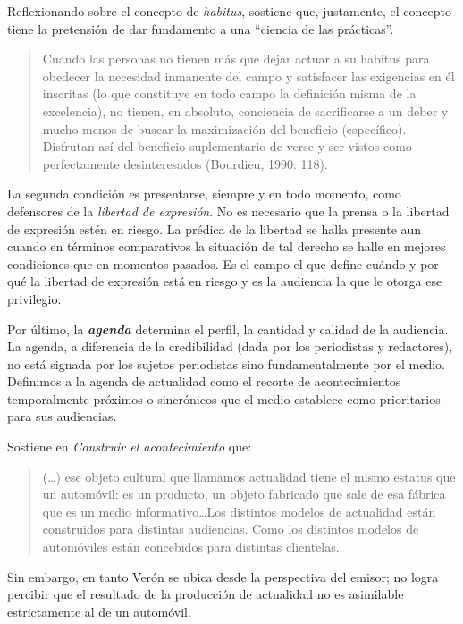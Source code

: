 Reflexionando sobre el concepto de \emph{habitus}, sostiene que, justamente, el concepto tiene la pretensión de dar fundamento a una \enquote{ciencia de las prácticas}.

\begin{quote}
	Cuando las personas no tienen más que dejar actuar a su habitus para obedecer la necesidad inmanente del campo y satisfacer las exigencias en él inscritas (lo que constituye en todo campo la definición misma de la excelencia), no tienen, en absoluto, conciencia de sacrificarse a un deber y mucho menos de buscar la maximización del beneficio (específico). Disfrutan así del beneficio suplementario de verse y ser vistos como perfectamente desinteresados (Bourdieu, 1990: 118).
\end{quote}

La segunda condición es presentarse, siempre y en todo momento, como defensores de la \emph{libertad de expresión}. No es necesario que la prensa o la libertad de expresión estén en riesgo. La prédica de la libertad se halla presente aun cuando en términos comparativos la situación de tal derecho se halle en mejores condiciones que en momentos pasados. Es el campo el que define cuándo y por qué la libertad de expresión está en riesgo y es la audiencia la que le otorga ese privilegio.

Por último, la \textbf{\emph{agenda}} determina el perfil, la cantidad y calidad de la audiencia. La agenda, a diferencia de la credibilidad (dada por los periodistas y redactores), no está signada por los sujetos periodistas sino fundamentalmente por el medio. Definimos a la agenda de actualidad como el recorte de acontecimientos temporalmente próximos o sincrónicos que el medio establece como prioritarios para sus audiencias.

Sostiene \textcite[III]{@6978-VERON1987} en \emph{Construir el acontecimiento} que:

\begin{quote}
	(\dots) ese objeto cultural que llamamos actualidad  tiene el mismo estatus que un automóvil: es un producto, un objeto fabricado que sale de esa fábrica que es un medio informativo\ldots Los distintos modelos de actualidad están construidos para distintas audiencias. Como los distintos modelos de automóviles están concebidos para distintas clientelas.
\end{quote}


Sin embargo, en tanto Verón se ubica desde la perspectiva del emisor; no logra percibir que el resultado de la producción de actualidad no es asimilable estrictamente al de un automóvil.

